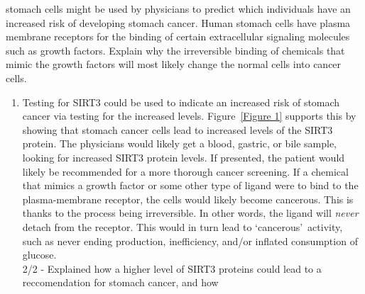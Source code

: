 \documentclass[11pt]{article}
\begin{document}
\begin{enumerate}
stomach cells might be used by physicians to predict which individuals have an increased risk of
developing stomach cancer. Human stomach cells have plasma membrane receptors for the
binding of certain extracellular signaling molecules such as growth factors. Explain why the
irreversible binding of chemicals that mimic the growth factors will most likely change the
normal cells into cancer cells.
        \begin{enumerate}
            \item Testing for SIRT3 could be used to indicate an increased risk of stomach cancer via testing for the increased levels.
            Figure~\ref{Figure 1} supports this by showing that stomach cancer cells lead to increased levels of the SIRT3 protein.
            The physicians would likely get a blood, gastric, or bile sample, looking for increased SIRT3 protein levels.
            If presented, the patient would likely be recommended for a more thorough cancer screening.
            If a chemical that mimics a growth factor or some other type of ligand were to bind to the plasma-membrane receptor, the cells would likely become cancerous.
            This is thanks to the process being irreversible.
            In other words, the ligand will \textit{never} detach from the receptor.
            This would in turn lead to \lq cancerous\rq\ activity, such as never ending production, inefficiency, and/or inflated consumption of glucose.\\
            2/2 - Explained how a higher level of SIRT3 proteins could lead to a reccomendation for stomach cancer, and how
        \end{enumerate}
    \end{enumerate}
\end{document}
